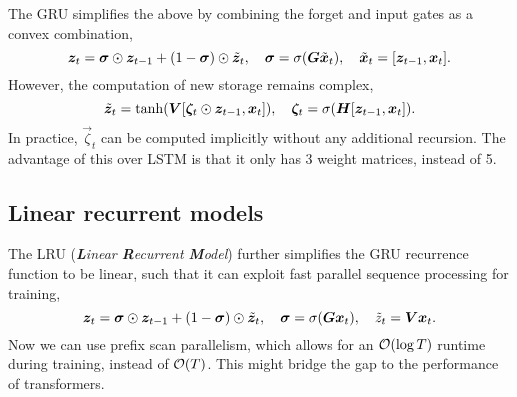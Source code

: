 The GRU simplifies the above by combining the forget and input gates as a convex combination, \[
    \vec{z}_t = \vec{\sigma} \odot \vec{z}_{t-1} + (1 - \vec{\sigma}) \odot \tilde{\vec{z}}_t, \quad \vec{\sigma} = \sigma \lft( \mat{G} \tilde{\vec{x}}_t \rgt), \quad \tilde{\vec{x}}_t = \lft[ \vec{z}_{t-1}, \vec{x}_t \rgt].
\]
However, the computation of new storage remains complex, \[
    \tilde{\vec{z}}_t = \tanh \lft( \mat{V} \lft[ \vec{\zeta}_t \odot \vec{z}_{t-1}, \vec{x}_t \rgt] \rgt), \quad \vec{\zeta}_t = \sigma \lft( \mat{H} \lft[ \vec{z}_{t-1}, \vec{x}_t \rgt] \rgt).
\]
In practice, $\vec{\zeta}_t$ can be computed implicitly without any additional recursion. The
advantage of this over LSTM is that it only has 3 weight matrices, instead of 5.

\subsection{Linear recurrent models}

The LRU (\textit{\textbf{L}inear \textbf{R}ecurrent \textbf{M}odel}) \citep{feng2024were} further
simplifies the GRU recurrence function to be linear, such that it can exploit fast parallel
sequence processing for training, \[
    \vec{z}_t = \vec{\sigma} \odot \vec{z}_{t-1} + (1-\vec{\sigma}) \odot \tilde{\vec{z}}_t, \quad \vec{\sigma} = \sigma \lft( \mat{G} \vec{x}_t \rgt), \quad \tilde{z}_t = \mat{V} \vec{x}_t.
\]
Now we can use prefix scan parallelism, which allows for an $\bigo{\log T}$ runtime during
training, instead of $\bigo{T}$. This might bridge the gap to the performance of
transformers.

